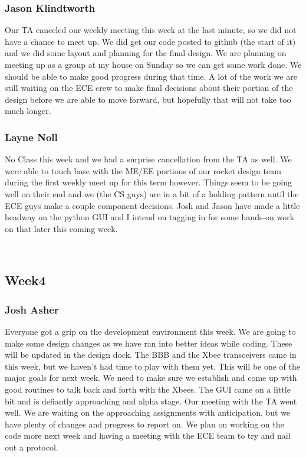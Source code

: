 \documentclass[10pt,draftclsnofoot,onecolumn]{IEEEtran}
\begin{document}
\subsubsection{Jason Klindtworth}
 Our TA canceled our weekly meeting this week at the last minute, so we did not have a chance to meet up. We did get our code posted to github (the start of it) and we did some layout and planning for the final design. We are planning on meeting up as a group at my house on Sunday so we can get some work done. We should be able to make good progress during that time. A lot of the work we are still waiting on the ECE crew to make final decisions about their portion of the design before we are able to move forward, but hopefully that will not take too much longer. \par

\subsubsection{Layne Noll}
No Class this week and we had a surprise cancellation from the TA as well. We were able to touch base with the ME/EE portions of our rocket design team during the first weekly meet up for this term however. Things seem to be going well on their end and we (the CS guys) are in a bit of a holding pattern until the ECE guys make a couple component decisions. Josh and Jason have made a little headway on the python GUI and I intend on tagging in for some hands-on work on that later this coming week.  \par\

\subsection{Week4}
\subsubsection{Josh Asher}
 Everyone got a grip on the development environment this week. We are going to make some design changes as we have ran into better ideas while coding. These will be updated in the design dock. The BBB and the Xbee transceivers came in this week, but we haven't had time to play with them yet. This will be one of the major goals for next week. We need to make sure we establish and come up with good routines to talk back and forth with the Xbees. The GUI came on a little bit and is defiantly approaching and alpha stage. Our meeting with the TA went well. We are waiting on the approaching assignments with anticipation, but we have plenty of changes and progress to report on. We plan on working on the code more next week and having a meeting with the ECE team to try and nail out a protocol. \par
\end{document}
